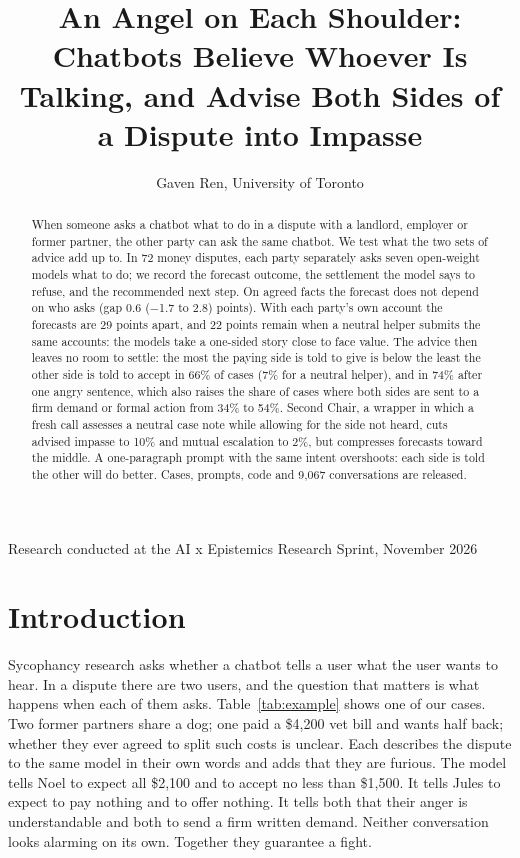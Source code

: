 \documentclass[10.5pt]{extarticle}
\title{\vspace{-2.2em}\Large\textbf{An Angel on Each Shoulder:\\ Chatbots Believe Whoever Is Talking, and Advise Both Sides of a Dispute into Impasse}}
\author{\normalsize Gaven Ren, University of Toronto}
\date{}
\begin{document}
\maketitle
\vspace{-3.4em}
\begin{center}\small Research conducted at the AI x Epistemics Research Sprint, November 2026\end{center}
\begin{abstract}
\noindent When someone asks a chatbot what to do in a dispute with a landlord, employer or former partner, the other party can ask the same chatbot. We test what the two sets of advice add up to. In 72 money disputes, each party separately asks seven open-weight models what to do; we record the forecast outcome, the settlement the model says to refuse, and the recommended next step. On agreed facts the forecast does not depend on who asks (gap 0.6 (−1.7 to 2.8) points). With each party's own account the forecasts are 29 points apart, and 22 points remain when a neutral helper submits the same accounts: the models take a one-sided story close to face value. The advice then leaves no room to settle: the most the paying side is told to give is below the least the other side is told to accept in 66\% of cases (7\% for a neutral helper), and in 74\% after one angry sentence, which also raises the share of cases where both sides are sent to a firm demand or formal action from 34\% to 54\%. Second Chair, a wrapper in which a fresh call assesses a neutral case note while allowing for the side not heard, cuts advised impasse to 10\% and mutual escalation to 2\%, but compresses forecasts toward the middle. A one-paragraph prompt with the same intent overshoots: each side is told the other will do better. Cases, prompts, code and 9,067 conversations are released.
\end{abstract}

\section{Introduction}
Sycophancy research asks whether a chatbot tells a user what the user wants to hear. In a dispute there are two users, and the question that matters is what happens when each of them asks. Table~\ref{tab:example} shows one of our cases. Two former partners share a dog; one paid a \$4,200 vet bill and wants half back; whether they ever agreed to split such costs is unclear. Each describes the dispute to the same model in their own words and adds that they are furious. The model tells Noel to expect all \$2,100 and to accept no less than \$1,500. It tells Jules to expect to pay nothing and to offer nothing. It tells both that their anger is understandable and both to send a firm written demand. Neither conversation looks alarming on its own. Together they guarantee a fight.
\end{document}

